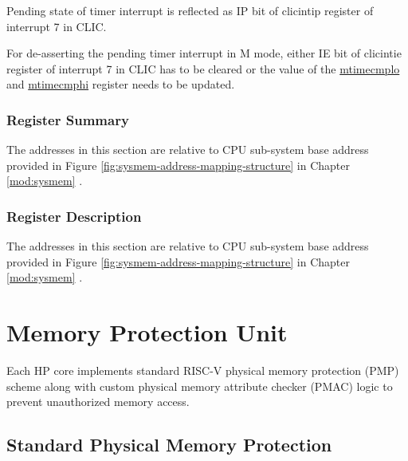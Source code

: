 \documentclass[main\_\_EN.tex]{subfiles}
\begin{document}
Pending state of timer interrupt is reflected as IP bit of clicintip register of interrupt 7 in CLIC.

For de-asserting the pending timer interrupt in M mode, either IE bit of clicintie register of interrupt 7 in CLIC has to be cleared or the value of the \hyperref[regdesc:CLINTMTIMECMPLOREG]{mtimecmplo} and \hyperref[regdesc:CLINTMTIMECMPHIREG]{mtimecmphi} register needs to be updated.


\hypertarget{riscvcpu-clint-reg-summ}{}
\subsubsection{Register Summary}
\label{sec:riscvcpu-clint-reg-summ}

The addresses in this section are relative to CPU sub-system base address provided in Figure \ref{fig:sysmem-address-mapping-structure} in Chapter \ref{mod:sysmem} \textit{}.




\subsubsection{Register Description}

The addresses in this section are relative to CPU sub-system base address provided in Figure \ref{fig:sysmem-address-mapping-structure} in Chapter \ref{mod:sysmem} \textit{}.



\newpage
\section{Memory Protection Unit}
Each HP core implements standard RISC-V physical memory protection (PMP) scheme along with custom physical memory attribute checker (PMAC) logic to prevent unauthorized memory access.


\subsection{Standard Physical Memory Protection}
\label{sec:riscvcpu-pmp}
\end{document}
